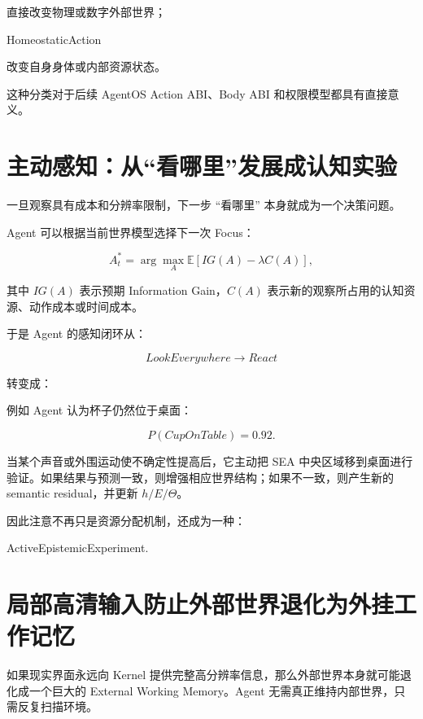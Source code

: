 直接改变物理或数字外部世界；

\begin{statementbox}
HomeostaticAction
\end{statementbox}

改变自身身体或内部资源状态。

这种分类对于后续 AgentOS Action ABI、Body ABI 和权限模型都具有直接意义。

\section{主动感知：从“看哪里”发展成认知实验}

一旦观察具有成本和分辨率限制，下一步 ``看哪里'' 本身就成为一个决策问题。

Agent 可以根据当前世界模型选择下一次 Focus：

\[
A_t^*
=
\arg\max_{A}
\mathbb E
\left[
IG(A)
-
\lambda C(A)
\right],
\]

其中 $IG(A)$ 表示预期 Information Gain，$C(A)$ 表示新的观察所占用的认知资源、动作成本或时间成本。

于是 Agent 的感知闭环从：

\[
LookEverywhere
\rightarrow
React
\]

转变成：

\begin{statementbox}
\centering
{}
\end{statementbox}

例如 Agent 认为杯子仍然位于桌面：

\[
P(CupOnTable)=0.92.
\]

当某个声音或外围运动使不确定性提高后，它主动把 SEA 中央区域移到桌面进行验证。如果结果与预测一致，则增强相应世界结构；如果不一致，则产生新的 semantic residual，并更新 $h/E/\Theta$。

因此注意不再只是资源分配机制，还成为一种：

\begin{statementbox}
ActiveEpistemicExperiment.
\end{statementbox}

\section{局部高清输入防止外部世界退化为外挂工作记忆}

如果现实界面永远向 Kernel 提供完整高分辨率信息，那么外部世界本身就可能退化成一个巨大的 External Working Memory。Agent 无需真正维持内部世界，只需反复扫描环境。

